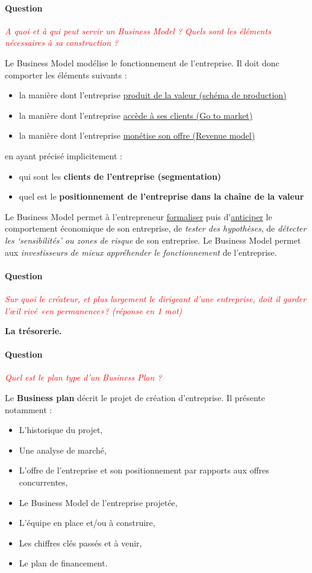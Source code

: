 \documentclass[12pt,oneside,a4paper]{article}
\newcommand{\question}[1]
{
\addtocounter{section}{1}
\paragraph*{Question \thesection}
\emph{\textcolor{red}{#1}}
}
\begin{document}
\question{A quoi et à qui peut servir un Business Model ? Quels sont les éléments nécessaires à sa construction ? }

Le Business Model modélise le fonctionnement de l’entreprise. Il doit donc comporter les éléments suivants :

\begin{itemize}[label=]
\item la manière dont l’entreprise \underline{produit de la valeur (schéma de production)}
\item la manière dont l’entreprise \underline{accède à ses clients (Go to market)}
\item la manière dont l’entreprise \underline{monétise son offre (Revenue model)}
\end{itemize}

en ayant précisé implicitement :

\begin{itemize}[label=]
\item qui sont les \textbf{clients de l’entreprise (segmentation)}
\item quel est le \textbf{positionnement de l’entreprise dans la chaîne de la valeur}
\end{itemize}

Le Business Model permet à l’entrepreneur \underline{formaliser} puis d’\underline{anticiper} le comportement économique de son entreprise, de \emph{tester des hypothèses}, de \emph{détecter les `sensibilités' ou zones de risque} de son entreprise.
Le Business Model permet aux \emph{investisseurs de mieux appréhender le fonctionnement} de l’entreprise.

\question{Sur quoi le créateur, et plus largement le dirigeant d’une entreprise, doit il garder l’œil rivé «en permanence»? (réponse en 1 mot)}

\textbf{La trésorerie.}

\question{Quel est le plan type d’un Business Plan ?}

Le \textbf{Business plan} décrit le projet de création d’entreprise. Il présente notamment :

\begin{itemize}[label=]
	\item L’historique du projet,
	\item Une analyse de marché,
	\item L’offre de l’entreprise et son positionnement par rapports aux offres concurrentes,
	\item Le Business Model de l’entreprise projetée,
	\item L’équipe en place et/ou à construire,
	\item Les chiffres clés passés et à venir,
	\item Le plan de financement.	
\end{itemize}
\end{document}
